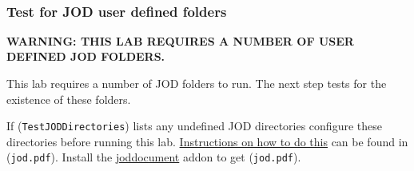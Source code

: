 \documentclass[11pt,letter,landscape]{article}
\begin{document}
    \begin{Verbatim}[commandchars=\\\{\}]


    \end{Verbatim}

    \subsubsection{Test for JOD user defined
folders}\label{test-for-jod-user-defined-folders}

\textbf{WARNING: THIS LAB REQUIRES A NUMBER OF USER DEFINED JOD
FOLDERS.}

This lab requires a number of JOD folders to run. The next step tests
for the existence of these folders.

If (\texttt{TestJODDirectories}) lists any undefined JOD directories
configure these directories before running this lab.
\href{https://github.com/jsoftware/general_joddocument/blob/master/pdfdoc/jod.pdf}{Instructions
on how to do this} can be found in (\texttt{jod.pdf}). Install the
\href{https://code.jsoftware.com/wiki/Addons/general/joddocument}{joddocument}
addon to get (\texttt{jod.pdf}).
\end{document}
